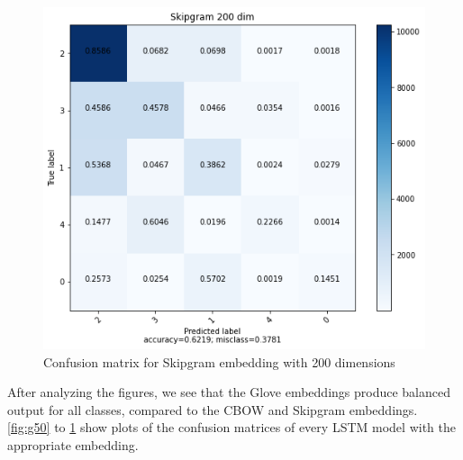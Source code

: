 \documentclass{article}
\begin{document}
\begin{figure}[ht]
    \centering
    \includegraphics[scale=0.4]{../code/images/SkipGram200.png}
    \caption{Confusion matrix for Skipgram embedding with 200 dimensions}
    \label{fig:s200}
\end{figure}
After analyzing the figures, we see that the Glove embeddings produce balanced output for all classes, compared to the CBOW and Skipgram embeddings. \cref{fig:g50} to \cref{fig:s200} show plots of the confusion matrices of every LSTM model with the appropriate embedding. 
\end{document}
